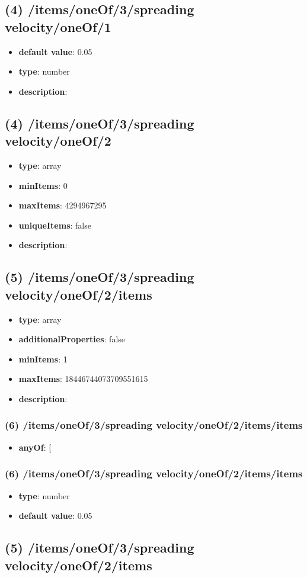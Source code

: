 \subsection{(4) /items/oneOf/3/spreading velocity/oneOf/1}
\begin{itemize}[leftmargin=4em]\item {\bf default value}: 0.05
\item {\bf type}: number
\item {\bf description}: 
\end{itemize}\subsection{(4) /items/oneOf/3/spreading velocity/oneOf/2}
\begin{itemize}[leftmargin=4em]\item {\bf type}: array
\item {\bf minItems}: 0
\item {\bf maxItems}: 4294967295
\item {\bf uniqueItems}: false
\item {\bf description}: 
\end{itemize}\subsection{(5) /items/oneOf/3/spreading velocity/oneOf/2/items}
\begin{itemize}[leftmargin=5em]\item {\bf type}: array
\item {\bf additionalProperties}: false
\item {\bf minItems}: 1
\item {\bf maxItems}: 18446744073709551615
\item {\bf description}: 
\end{itemize}\subsubsection{(6) /items/oneOf/3/spreading velocity/oneOf/2/items/items}
\begin{itemize}[leftmargin=6em]\item {\bf anyOf}: [\end{itemize}\subsubsection{(6) /items/oneOf/3/spreading velocity/oneOf/2/items/items}
\begin{itemize}[leftmargin=6em]\item {\bf type}: number\item {\bf default value}: 0.05
\end{itemize}\subsection{(5) /items/oneOf/3/spreading velocity/oneOf/2/items}
